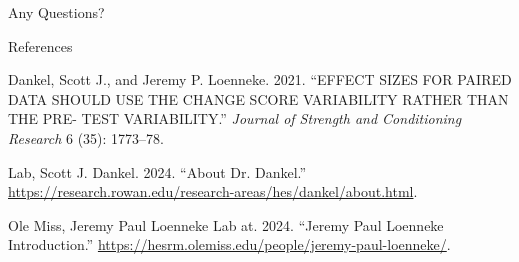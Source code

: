 \documentclass[
  ignorenonframetext,
  aspectratio=169,
]{beamer}
\newlength{\cslhangindent}
\newlength{\cslentryspacingunit} %
\newenvironment{CSLReferences}[2] %
 {%
  \setlength{\parindent}{0pt}
  \ifodd #1
  \let\oldpar\par
  \def\par{\hangindent=\cslhangindent\oldpar}
  \fi
  \setlength{\parskip}{#2\cslentryspacingunit}
 }%
 {}
\begin{document}
\begin{frame}{Any Questions?}
\protect\hypertarget{any-questions}{}
\end{frame}

\begin{frame}{References}
\protect\hypertarget{references}{}
\hypertarget{refs}{}
\begin{CSLReferences}{1}{0}
\leavevmode{}%
Dankel, Scott J., and Jeremy P. Loenneke. 2021. {``EFFECT SIZES FOR
PAIRED DATA SHOULD USE THE CHANGE SCORE VARIABILITY RATHER THAN THE PRE-
TEST VARIABILITY.''} \emph{Journal of Strength and Conditioning
Research} 6 (35): 1773--78.

\leavevmode{}%
Lab, Scott J. Dankel. 2024. {``About Dr. Dankel.''}
\url{https://research.rowan.edu/research-areas/hes/dankel/about.html}.

\leavevmode{}%
Ole Miss, Jeremy Paul Loenneke Lab at. 2024. {``Jeremy Paul Loenneke
Introduction.''}
\url{https://hesrm.olemiss.edu/people/jeremy-paul-loenneke/}.

\end{CSLReferences}
\end{frame}
\end{document}

